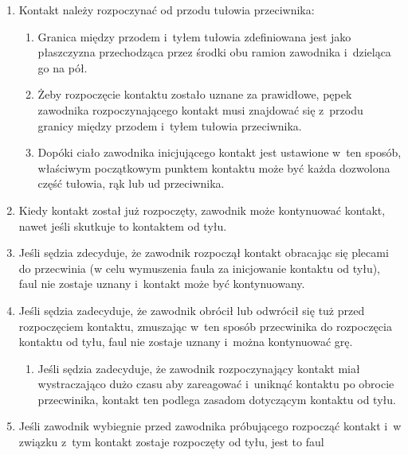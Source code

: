 \documentclass[12pt,a4paper]{article}
\begin{document}
\begin{enumerate}
	\item
	      Kontakt należy rozpoczynać od przodu tułowia przeciwnika:

	      \begin{enumerate}
		      \item
		            Granica między przodem i~tyłem tułowia zdefiniowana jest jako
		            płaszczyzna przechodząca przez środki obu ramion zawodnika i~dzieląca go na pół.
		      \item
		            Żeby rozpoczęcie kontaktu zostało uznane za prawidłowe, pępek
		            zawodnika rozpoczynającego kontakt musi znajdować się z~przodu
		            granicy między przodem i~tyłem tułowia przeciwnika.
		      \item
		            Dopóki ciało zawodnika inicjującego kontakt jest ustawione w~ten
		            sposób, właściwym początkowym punktem kontaktu może być każda
		            dozwolona część tułowia, rąk lub ud przeciwnika.
	      \end{enumerate}
	\item
	      Kiedy kontakt został już rozpoczęty, zawodnik może kontynuować
	      kontakt, nawet jeśli skutkuje to kontaktem od tyłu.
	\item
	      Jeśli sędzia zdecyduje, że zawodnik rozpoczął kontakt obracając się
	      plecami do przecwinia (w celu wymuszenia faula za inicjowanie kontaktu
	      od tyłu), faul nie zostaje uznany i~kontakt może być kontynuowany.
	\item
	      Jeśli sędzia zadecyduje, że zawodnik obrócił lub odwrócił się tuż
	      przed rozpoczęciem kontaktu, zmuszając w~ten sposób przecwinika do
	      rozpoczęcia kontaktu od tyłu, faul nie zostaje uznany i~można
	      kontynuować grę.

	      \begin{enumerate}
		      \item
		            Jeśli sędzia zadecyduje, że zawodnik rozpoczynający kontakt miał
		            wystraczająco dużo czasu aby zareagować i~uniknąć kontaktu po
		            obrocie przecwinika, kontakt ten podlega zasadom dotyczącym kontaktu
		            od tyłu.
	      \end{enumerate}
	\item
	      Jeśli zawodnik wybiegnie przed zawodnika próbującego rozpocząć kontakt
	      i~w związku z~tym kontakt zostaje rozpoczęty od tyłu, jest to faul
\end{enumerate}
\end{document}
